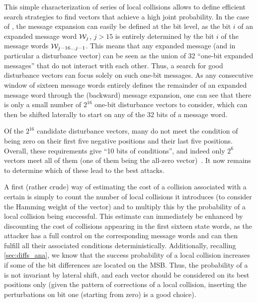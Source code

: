 This simple characterization of series of local collisions allows to define efficient search strategies to find vectors
that achieve a high joint probability.
In the case of \shazero, the message expansion can easily be defined at the bit level, as the bit $i$ of an expanded message word $\mathcal{W}_j$, $j > 15$ is entirely determined by the bit $i$
of the message words $\mathcal{W}_{j-16\ldots j-1}$. This means that any expanded message (and in particular a disturbance vector) can be seen as the union of 32 ``one-bit expanded messages'' that
do not interact with each other. Thus, a search for good disturbance vectors can focus solely on such one-bit messages. As any consecutive window of sixteen message words entirely
defines the remainder of an expanded message word through the (backward) message expansion, one can see that there is only a small number of $2^{16}$ one-bit disturbance vectors to consider, which
can then be shifted laterally to start on any of the 32 bits of a message word.

Of the $2^{16}$ candidate disturbance vectors, many do not meet the condition of being zero on their first five negative positions and their last five positions. Overall, these requirements give
``10 bits of conditions'', and indeed only $2^6$ vectors meet all of them (one of them being the all-zero vector)~\cite[Chapter 5]{algocrypt}. It now remains to determine which of these lead
to the best attacks.

\medskip

A first (rather crude) way of estimating the cost of a collision associated with a certain \dv is simply to count the number of local collisions it introduces (\ie to consider the Hamming weight
of the vector) and to multiply this by the probability of a local collision being successful. This estimate can immediately be enhanced by discounting the cost of collisions appearing in the
first sixteen state words, as the attacker has a full control on the corresponding message words and can then fulfill all their associated conditions deterministically. Additionally, recalling
\autoref{sec:diffs_ana}, we know that the success probability of a local collision increases if some of the bit differences are located on the MSB. Thus, the probability of a \dv is not
invariant by lateral shift, and each vector should be considered on its best positions only (given the pattern of corrections of a local collision, inserting the perturbations on
bit one (starting from zero) is a good choice).

